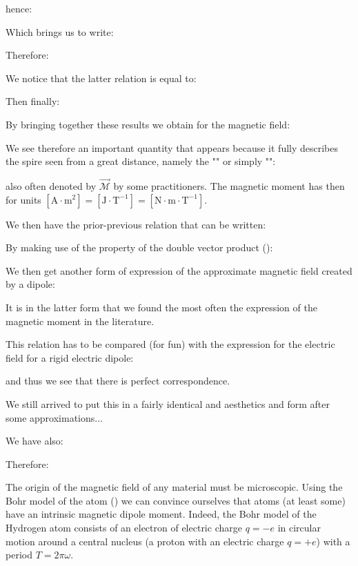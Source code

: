 	hence:
	
	Which brings us to write:
	
	Therefore:
	
	We notice that the latter relation is equal to:
	
	Then finally:
	
	By bringing together these results we obtain for the magnetic field:
	
	We see therefore an important quantity that appears because it fully describes the spire seen from a great distance, namely the "\label{magnetic local dipole moment}" or simply "":
	
	also often denoted by $\vec{\mathcal{M}}$ by some practitioners. The magnetic moment has then for units $[\text{A}\cdot\text{m}^2]=[\text{J}\cdot\text{T}^{-1}]=[\text{N}\cdot\text{m}\cdot \text{T}^{-1}]$. 
	
	We then have the prior-previous relation that can be written:
	
	By making use of the property of the double vector product ():
	
	We then get another form of expression of the approximate magnetic field created by a dipole:
	
	It is in the latter form that we found the most often the expression of the magnetic moment in the literature.
	
	This relation has to be compared (for fun) with the expression for the electric field for a rigid electric dipole:
	
	and thus we see that there is perfect correspondence.
	
	We still arrived to put this in a fairly identical and aesthetics and form after some approximations...

	We have also:
	
	Therefore:
	
	The origin of the magnetic field of any material must be microscopic. Using the Bohr model of the atom () we can convince ourselves that atoms (at least some) have an intrinsic magnetic dipole moment. Indeed, the Bohr model of the Hydrogen atom consists of an electron of electric charge $q=-e$ in circular motion around a central nucleus (a proton with an electric charge $q=+e$) with a period $T=2\pi\omega$.
	
